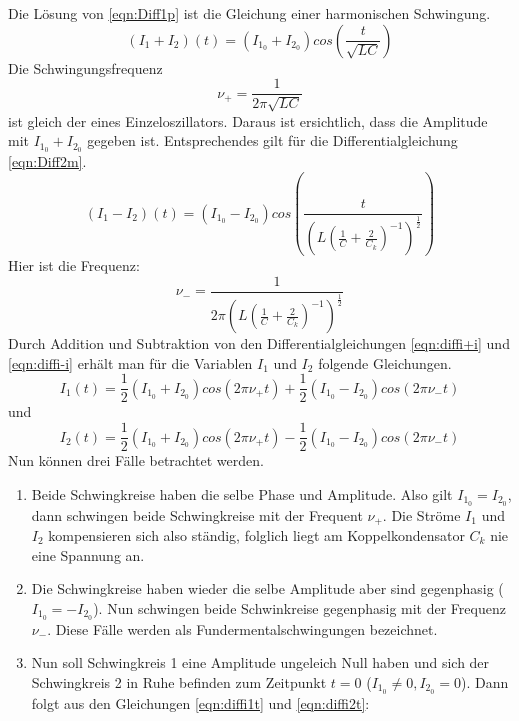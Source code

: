 Die Lösung von \eqref{eqn:Diff1p} ist die Gleichung einer harmonischen Schwingung.
\begin{equation}
  (I_1 + I_2)(t) = (I_{1_{0}} + I_{2_{0}}) cos \left(\frac{t}{\sqrt{LC}}\right)
  \label{eqn:diffi+i}
\end{equation}
Die Schwingungsfrequenz
\begin{equation}
  \nu_+ = \frac{1}{2\pi\sqrt{LC}}
  \label{eqn:nu+}
\end{equation}
ist gleich der eines Einzeloszillators. Daraus ist ersichtlich, dass die Amplitude mit $ I_{1_{0}} + I_{2_{0}} $ gegeben ist. Entsprechendes gilt für die
Differentialgleichung \eqref{eqn:Diff2m}.
\begin{equation}
  (I_1 - I_2)(t) = (I_{1_{0}} - I_{2_{0}}) cos \left(\frac{t}{\left(L\left(\frac{1}{C} + \frac{2}{C_k}\right)^{-1}\right)^{\frac{1}{2}}}\right)
  \label{eqn:diffi-i}
\end{equation}
Hier ist die Frequenz:
\begin{equation}
  \nu_- = \frac{1}{2\pi \left(L\left(\frac{1}{C} + \frac{2}{C_k}\right)^{-1}\right)^{\frac{1}{2}}}
\label{eqn:nu-}
\end{equation}
Durch Addition und Subtraktion von den Differentialgleichungen \eqref{eqn:diffi+i} und \eqref{eqn:diffi-i} erhält man für die Variablen $I_1$ und $I_2$ folgende Gleichungen.
\begin{equation}
  I_1 (t) = \frac{1}{2}(I_{1_{0}} + I_{2_{0}}) cos(2 \pi \nu_+ t) + \frac{1}{2}(I_{1_{0}} - I_{2_{0}})cos(2 \pi \nu_- t)
  \label{eqn:diffi1t}
\end{equation}
und
\begin{equation}
  I_2 (t) = \frac{1}{2}(I_{1_{0}} + I_{2_{0}}) cos(2 \pi \nu_+ t) - \frac{1}{2}(I_{1_{0}} - I_{2_{0}})cos(2 \pi \nu_- t)
\label{eqn:diffi2t}
\end{equation}
Nun können drei Fälle betrachtet werden.
\begin{enumerate}
  \item Beide Schwingkreise haben die selbe Phase und Amplitude. Also gilt $I_{1_{0}}= I_{2_{0}}$, dann schwingen beide Schwingkreise mit der Frequent $\nu_+$.
  Die Ströme $I_1$ und $I_2$ kompensieren sich also ständig, folglich liegt am Koppelkondensator $C_k$ nie eine Spannung an.
  \item Die Schwingkreise haben wieder die selbe Amplitude aber sind gegenphasig ($I_{1_{0}}= - I_{2_{0}}$). Nun schwingen beide Schwinkreise gegenphasig mit der Frequenz $\nu_-$.
   Diese Fälle werden als Fundermentalschwingungen bezeichnet.
  \item Nun soll Schwingkreis 1 eine Amplitude ungeleich Null haben und sich der Schwingkreis 2 in Ruhe befinden zum Zeitpunkt $t= 0$ ($I_{1_{0}}\neq 0 , I_{2_{0}}= 0$).
  Dann folgt aus den Gleichungen \eqref{eqn:diffi1t} und \eqref{eqn:diffi2t}:
\end{enumerate}
